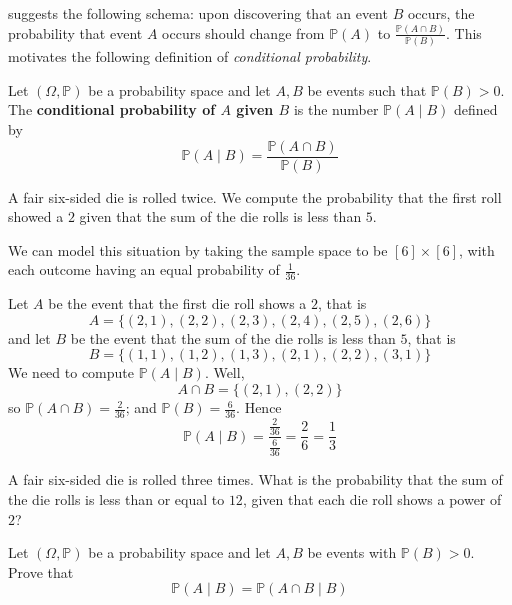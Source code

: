  suggests the following schema: upon discovering that an event $B$ occurs, the probability that event $A$ occurs should change from $\mathbb{P}(A)$ to $\frac{\mathbb{P}(A \cap B)}{\mathbb{P}(B)}$. This motivates the following definition of \textit{conditional probability}.

\begin{definition}
\label{defConditionalProbability}
Let $(\Omega,\mathbb{P})$ be a probability space and let $A,B$ be events such that $\mathbb{P}(B)>0$. The \textbf{conditional probability of $A$ given $B$} is the number $\mathbb{P}(A \mid B)$  defined by
\[ \mathbb{P}(A \mid B) = \frac{\mathbb{P}(A \cap B)}{\mathbb{P}(B)} \]
\end{definition}

\begin{example}
A fair six-sided die is rolled twice. We compute the probability that the first roll showed a $2$ given that the sum of the die rolls is less than $5$.

We can model this situation by taking the sample space to be $[6] \times [6]$, with each outcome having an equal probability of $\frac{1}{36}$.

Let $A$ be the event that the first die roll shows a $2$, that is
\[ A = \{ (2,1),(2,2),(2,3),(2,4),(2,5),(2,6) \} \]
and let $B$ be the event that the sum of the die rolls is less than $5$, that is
\[ B = \{ (1,1),(1,2),(1,3),(2,1),(2,2),(3,1) \} \]
We need to compute $\mathbb{P}(A \mid B)$. Well,
\[ A \cap B = \{ (2,1), (2,2) \} \]
so $\mathbb{P}(A \cap B) = \frac{2}{36}$; and $\mathbb{P}(B) = \frac{6}{36}$. Hence
\[ \mathbb{P}(A \mid B) = \frac{\frac{2}{36}}{\frac{6}{36}} = \frac{2}{6} = \frac{1}{3} \]
\end{example}

\begin{exercise}
A fair six-sided die is rolled three times. What is the probability that the sum of the die rolls is less than or equal to $12$, given that each die roll shows a power of $2$?
\end{exercise}

\begin{exercise}
\label{exConditionalProbabilityOfIntersection}
Let $(\Omega,\mathbb{P})$ be a probability space and let $A,B$ be events with $\mathbb{P}(B)>0$. Prove that
\[ \mathbb{P}(A \mid B) = \mathbb{P}(A \cap B \mid B) \]
\end{exercise}

